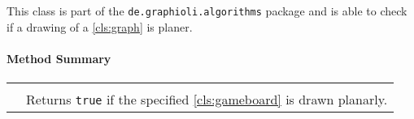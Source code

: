 This class is part of the \texttt{de.graphioli.algorithms} package and is able to check if a drawing of a \ref{cls:graph} is planer. \\

\centerdash

\paragraph*{Method Summary}
\paragraph*{}
\begin{longtable}{Lp{10cm}}
	\startmethodtable
	 \\
	& Returns \texttt{true} if the specified \ref{cls:gameboard} is drawn planarly. \\
	\hline
\end{longtable}
